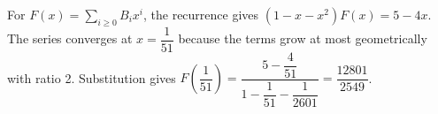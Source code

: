 For $ F(x)=\sum_{i\ge0}B_ix^i $, the recurrence gives $(1-x-x^2)F(x)=5-4x $. The series converges at $ x=\dfrac{1}{51}$ because the terms grow at most geometrically with ratio 2. Substitution gives $ F(\dfrac{1}{51})=\dfrac{5-\dfrac{4}{51}}{1-\dfrac{1}{51}-\dfrac{1}{2601}}=\boxed{\dfrac{12801}{2549}}$.
